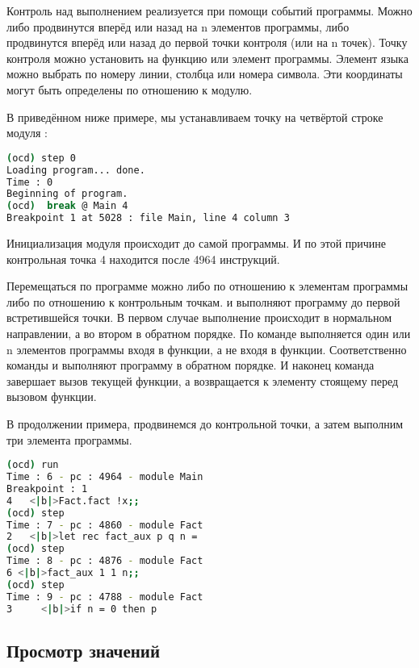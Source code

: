 Контроль над выполнением реализуется при помощи событий программы. Можно либо 
продвинутся вперёд или назад на n элементов программы, либо продвинутся вперёд 
или назад до первой точки контроля (или на n точек). Точку контроля можно 
установить на функцию или элемент программы. Элемент языка можно выбрать по 
номеру линии, столбца или номера символа. Эти координаты могут быть определены 
по отношению к модулю.

В приведённом ниже примере, мы устанавливаем точку на четвёртой строке модуля 
:

\begin{lstlisting}[language=Bash]
(ocd) step 0
Loading program... done.
Time : 0
Beginning of program.
(ocd)  break @ Main 4
Breakpoint 1 at 5028 : file Main, line 4 column 3
\end{lstlisting}

Инициализация модуля происходит до самой программы. И по этой причине 
контрольная точка 4 находится после 4964 инструкций.

Перемещаться по программе можно либо по отношению к элементам программы либо по 
отношению к контрольным точкам.  и  выполняют программу 
до первой встретившейся точки. В первом случае выполнение происходит в 
нормальном направлении, а во втором в обратном порядке. По команде  
выполняется один или n элементов программы входя в функции, а  не 
входя в функции. Соответственно команды  и  
выполняют программу в обратном порядке. И наконец команда  
завершает вызов текущей функции, а  возвращается к элементу 
стоящему перед вызовом функции.

В продолжении примера, продвинемся до контрольной точки, а затем выполним три 
элемента программы. 

\begin{lstlisting}[language=Bash]
(ocd) run
Time : 6 - pc : 4964 - module Main
Breakpoint : 1
4   <|b|>Fact.fact !x;;
(ocd) step
Time : 7 - pc : 4860 - module Fact
2   <|b|>let rec fact_aux p q n = 
(ocd) step
Time : 8 - pc : 4876 - module Fact
6 <|b|>fact_aux 1 1 n;;
(ocd) step
Time : 9 - pc : 4788 - module Fact
3     <|b|>if n = 0 then p
\end{lstlisting}

\subsection {Просмотр значений}
\label{subsubsec:inspection_of_values}

